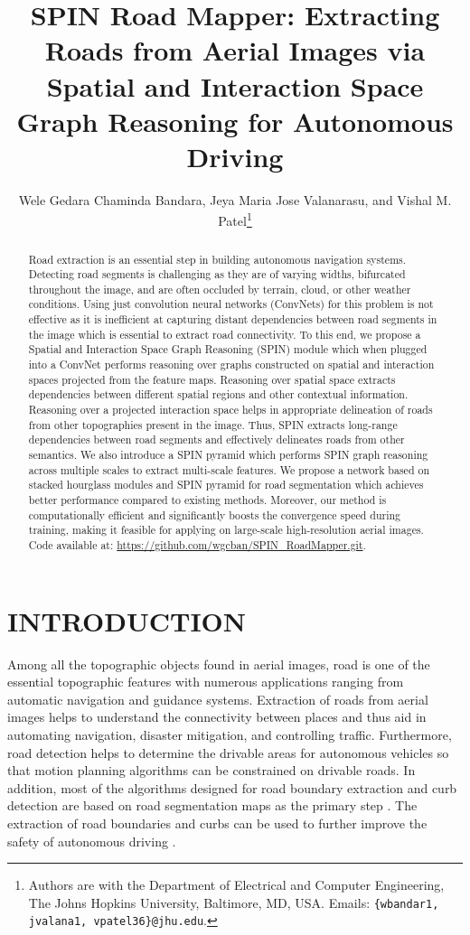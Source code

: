 \documentclass[letterpaper, 10 pt, conference]{ieeeconf}
\title{\LARGE \bf
SPIN Road Mapper: Extracting Roads from Aerial Images via Spatial and Interaction Space Graph Reasoning for Autonomous Driving
}
\author{Wele Gedara Chaminda Bandara, Jeya Maria Jose Valanarasu, and Vishal M. Patel\thanks{Authors are with the Department of Electrical and Computer Engineering, The Johns Hopkins University, Baltimore, MD, USA. Emails: 
{\tt\small \{wbandar1, jvalana1, vpatel36\}@jhu.edu}.}}
\begin{document}
\maketitle
\thispagestyle{empty}
\pagestyle{empty}


\begin{abstract}
Road extraction is an essential step in building autonomous navigation systems. Detecting road segments is challenging as they are of varying widths, bifurcated throughout the image, and are often occluded by terrain, cloud, or other weather conditions. Using just convolution neural networks (ConvNets) for this problem is not effective as it is inefficient at capturing distant dependencies between road segments in the image which is essential to extract road connectivity. To this end, we propose a Spatial and Interaction Space Graph Reasoning (SPIN) module which when plugged into a ConvNet performs reasoning over graphs constructed on spatial and interaction spaces projected from the feature maps. Reasoning over spatial space extracts dependencies between different spatial regions and other contextual information. Reasoning over a projected interaction space helps in appropriate delineation of roads from other topographies present in the image. Thus, SPIN extracts long-range dependencies between road segments and effectively delineates roads from other semantics. We also introduce a SPIN pyramid which performs SPIN graph reasoning across multiple scales to extract multi-scale features. We propose a network based on stacked hourglass modules and SPIN pyramid for road segmentation which achieves better performance compared to existing methods. Moreover, our method is computationally efficient and significantly boosts the convergence speed during training, making it feasible for applying on large-scale high-resolution aerial images. Code available at: \url{https://github.com/wgcban/SPIN_RoadMapper.git}.
\end{abstract}


\section{INTRODUCTION}
Among all the topographic objects found in aerial images, road is one of the essential topographic features with numerous applications ranging from automatic navigation and guidance systems. Extraction of roads from aerial images helps to understand the connectivity between places and thus aid in automating navigation, disaster mitigation, and controlling traffic. Furthermore, road detection helps to determine the drivable areas for autonomous vehicles so that motion planning algorithms can be constrained on drivable roads. In addition, most of the algorithms designed for road boundary extraction and curb detection are based on road segmentation maps as the primary step \cite{mnih2010learning,mattyus2017deeproadmapper}.  The extraction of road boundaries and curbs can be used to further improve the safety of autonomous driving \cite{xu2021icurb,xu2021topo}. 
\end{document}
